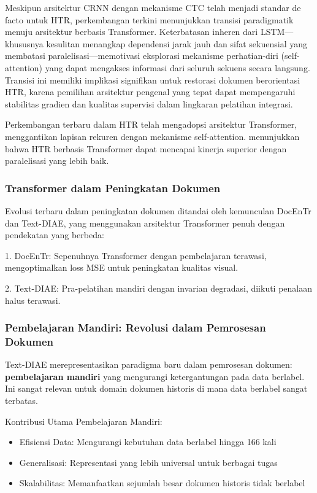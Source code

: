 \vspace{1.5ex}

Meskipun arsitektur CRNN dengan mekanisme CTC telah menjadi standar de facto untuk HTR, perkembangan terkini menunjukkan transisi paradigmatik menuju arsitektur berbasis Transformer. Keterbatasan inheren dari LSTM—khususnya kesulitan menangkap dependensi jarak jauh dan sifat sekuensial yang membatasi paralelisasi—memotivasi eksplorasi mekanisme perhatian-diri (self-attention) yang dapat mengakses informasi dari seluruh sekuens secara langsung. Transisi ini memiliki implikasi signifikan untuk restorasi dokumen berorientasi HTR, karena pemilihan arsitektur pengenal yang tepat dapat mempengaruhi stabilitas gradien dan kualitas supervisi dalam lingkaran pelatihan integrasi.

Perkembangan terbaru dalam HTR telah mengadopsi arsitektur Transformer, menggantikan lapisan rekuren dengan mekanisme self-attention. \citep{diaz2021} menunjukkan bahwa HTR berbasis Transformer dapat mencapai kinerja superior dengan paralelisasi yang lebih baik.

\subsubsection{Transformer dalam Peningkatan Dokumen}
\label{subsubsec:transformer-dokumen}

Evolusi terbaru dalam peningkatan dokumen ditandai oleh kemunculan DocEnTr dan Text-DIAE, yang menggunakan arsitektur Transformer penuh dengan pendekatan yang berbeda:

1. DocEnTr: Sepenuhnya Transformer dengan pembelajaran terawasi, mengoptimalkan loss MSE untuk peningkatan kualitas visual.

2. Text-DIAE: Pra-pelatihan mandiri dengan invarian degradasi, diikuti penalaan halus terawasi.

\subsubsection{Pembelajaran Mandiri: Revolusi dalam Pemrosesan Dokumen}
\label{subsubsec:pembelajaran-mandiri}

Text-DIAE merepresentasikan paradigma baru dalam pemrosesan dokumen: \textbf{pembelajaran mandiri} yang mengurangi ketergantungan pada data berlabel. Ini sangat relevan untuk domain dokumen historis di mana data berlabel sangat terbatas.

Kontribusi Utama Pembelajaran Mandiri:
\begin{itemize}
 \item Efisiensi Data: Mengurangi kebutuhan data berlabel hingga 166 kali
 \item Generalisasi: Representasi yang lebih universal untuk berbagai tugas
 \item Skalabilitas: Memanfaatkan sejumlah besar dokumen historis tidak berlabel
\end{itemize}

